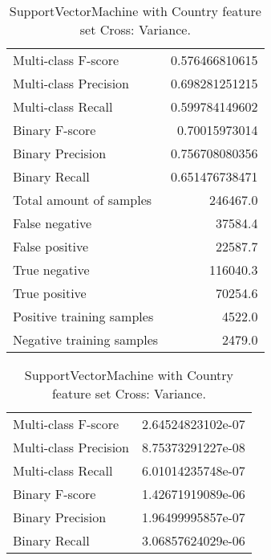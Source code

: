 \begin{table}[H]
\begin{minipage}{0.5\textwidth}
\caption{SupportVectorMachine with Country feature set Cross: Average.}
\centering
\begin{tabular}{l r}
\toprule
Multi-class F-score & 0.576466810615 \\
Multi-class Precision & 0.698281251215 \\
Multi-class Recall & 0.599784149602 \\
\midrule
Binary F-score & 0.70015973014 \\
Binary Precision & 0.756708080356 \\
Binary Recall & 0.651476738471 \\
\midrule
Total amount of samples & 246467.0 \\
False negative & 37584.4 \\
False positive & 22587.7 \\
True negative & 116040.3 \\
True positive & 70254.6 \\
\midrule
Positive training samples & 4522.0 \\
Negative training samples & 2479.0 \\
\bottomrule
\end{tabular}
\end{minipage}
\hfillx
\begin{minipage}{0.5\textwidth}
\caption{SupportVectorMachine with Country feature set Cross: Variance.}
\centering
\begin{tabular}{l r}
\toprule
Multi-class F-score & 2.64524823102e-07 \\
Multi-class Precision & 8.75373291227e-08 \\
Multi-class Recall & 6.01014235748e-07 \\
\midrule
Binary F-score & 1.42671919089e-06 \\
Binary Precision & 1.96499995857e-07 \\
Binary Recall & 3.06857624029e-06 \\
\bottomrule
\end{tabular}
\end{minipage}
\end{table}